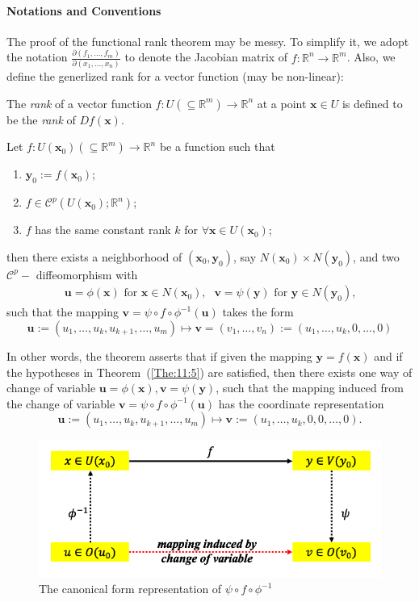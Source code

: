 \paragraph{Notations and Conventions}
The proof of the functional rank theorem may be messy. To simplify it, we adopt the notation $\frac{\partial (f_1,\dots,f_m)}{\partial (x_1,\dots,x_n)}$ to denote the Jacobian matrix of $f:\mathbb{R}^n\to\mathbb{R}^m$. Also, we define the generlized rank for a vector function (may be non-linear):
\begin{definition}[Rank]
The \emph{rank} of a vector function $f:U(\subseteq\mathbb{R}^m)\to\mathbb{R}^n$ at a point $\bm x\in U$ is defined to be the \textit{rank} of $Df(\bm x)$.
\end{definition}
%
\begin{theorem}\label{The:11:5}
Let $f: U(\bm x_0) (\subseteq\mathbb{R}^m)\to\mathbb{R}^n$ be a function such that
\begin{enumerate}
\item
$\bm y_0:=f(\bm x_0)$;
\item
$f\in\mathcal{C}^p(U(\bm x_0);\mathbb{R}^n)$;
\item
$f$ has the same constant rank $k$ for $\forall\bm x\in U(\bm x_0)$;
\end{enumerate}
then there exists a neighborhood of $(\bm x_0,\bm y_0)$, say $N(\bm x_0)\times N(\bm y_0)$, and two $\mathcal{C}^p-$ diffeomorphism with
\[
\begin{array}{ll}
\mbox{$\bm u=\phi(\bm x)$ for $\bm x\in N(\bm x_0)$,}
&
\mbox{$\bm v=\psi(\bm y)$ for $\bm y\in N(\bm y_0)$,}
\end{array}
\]
such that the mapping $\bm v = \psi\circ f\circ\phi^{-1}(\bm u)$ takes the form
\[
\bm u:=(u_1,\dots,u_k,u_{k+1},\dots,u_m)\mapsto
\bm v=(v_1,\dots,v_n):=(u_1,\dots,u_k,0,\dots,0)
\]
\end{theorem}
\begin{remark}
In other words, the theorem asserts that if given the mapping $\bm y=f(\bm x)$ and if the hypotheses in Theorem~(\ref{The:11:5}) are satisfied, then there exists one way of change of variable $\bm u=\phi(\bm x), \bm v=\psi(\bm y)$, such that the mapping induced from the change of variable $\bm v = \psi\circ f\circ\phi^{-1}(\bm u)$ has the coordinate representation
\[
\bm u:=(u_1,\dots,u_k,u_{k+1},\dots,u_m)\mapsto\bm v:=
(u_1,\dots,u_k,0,0,\dots,0).
\]
\begin{figure}[H]
\centering
\includegraphics[width=14cm]{week11/F_11_3}
\caption{The canonical form representation of $\psi\circ f\circ\phi^{-1}$}
\end{figure}
\end{remark}


